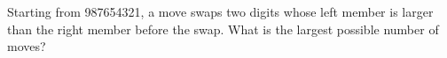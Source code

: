 Starting from 987654321, a move swaps two digits whose left member is larger than the right member before the swap. What is the largest possible number of moves?
